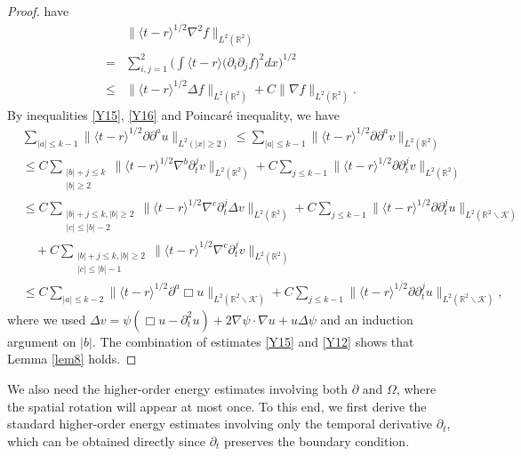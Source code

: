 \documentclass[11pt, reqno]{amsart}
\theoremstyle{definition}
\theoremstyle{remark}
\theoremstyle{definition}
\numberwithin{equation}{section}
\numberwithin{equation}{section}
\def\leq{\leqslant}
\def\geq{\geqslant}
\begin{document}
\begin{proof}
have
\begin{align}\label{Y16}
&\|\langle t-r\rangle^{1/2}\nabla^2f\|_{L^2(\mathbb R^2)}
\nonumber\\=&\sum_{i,j=1}^2\Big(\int\langle
t-r\rangle\big(\partial_i\partial_jf\big)^2dx\Big)^{1/2}
\nonumber\\\leq& \|\langle t-r\rangle^{1/2}\Delta f\|_{L^2(\mathbb
R^2)}+C\|\nabla f\|_{L^2(\mathbb R^2)}.
\end{align}
By inequalities \eqref{Y15}, \eqref{Y16} and Poincar\'{e} inequality, we
have
\begin{align}\label{Y12} &\sum_{|a|\leq k-1}\|\langle
t-r\rangle^{1/2}\partial\partial^au\|_{L^2(|x|\geq
2)}\leq\sum_{|a|\leq k-1}\|\langle
t-r\rangle^{1/2}\partial\partial^av\|_{L^2(\mathbb
R^2)}\nonumber\\&\leq C\sum_{\substack{|b|+j\leq
k\\|b|\geq2}}\|\langle t-r\rangle^{1/2}\nabla^b
\partial_t^jv\|_{L^2(\mathbb R^2)}+C\sum_{j\leq k-1}\|\langle t-r\rangle^{1/2}\partial
\partial_t^jv\|_{L^2(\mathbb R^2)}
\nonumber\\&\leq C\sum_{\substack{|b|+j\leq k,|b|\geq2\\|c|\leq
|b|-2}}\|\langle t-r\rangle^{1/2}\nabla^c\partial_t^j\Delta
v\|_{L^2(\mathbb R^2)}+C\sum_{j\leq k-1}\|\langle
t-r\rangle^{1/2}\partial
\partial_t^ju\|_{L^2(\mathbb R^2\backslash\mathcal {K})}\nonumber\\&\quad
+C\sum_{\substack{|b|+j\leq k,|b|\geq2\\|c|\leq |b|-1}}\|\langle
t-r\rangle^{1/2}\nabla^c
\partial_t^jv\|_{L^2(\mathbb R^2)}
\nonumber\\&\leq C\sum_{|a|\leq k-2}\|\langle
t-r\rangle^{1/2}\partial^a\Box u\|_{L^2(\mathbb
R^2\backslash\mathcal {K})}+C\sum_{j\leq k-1}\|\langle
t-r\rangle^{1/2}\partial\partial_t^ju\|_{L^2(\mathbb
R^2\backslash\mathcal {K})},
\end{align}
where we used $\Delta v=\psi(\Box
u-\partial_t^2u)+2\nabla\psi\cdot\nabla u+u\Delta\psi$ and an
induction argument on $|b|$. The combination of estimates
\eqref{Y15} and \eqref{Y12} shows that Lemma \ref{lem8} holds.
\end{proof}
We also need the higher-order energy estimates involving both
$\partial$ and $\Omega$, where the spatial rotation will appear at
most once. To this end, we first derive the standard higher-order energy estimates involving only the temporal derivative $\partial_t$, which can be obtained 
directly since $\partial_t$ preserves the boundary condition.
\end{document}
